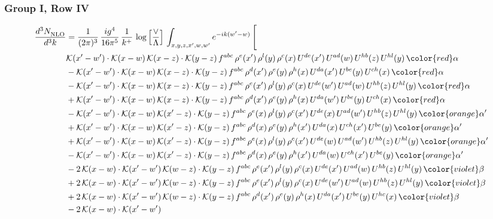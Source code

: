\subsubsection{Group I, Row IV}
\begin{align}
    \frac{d^{3}N_{\rm NLO}^{\rm}}{d^{3}k}  & = \frac{1}{(2\pi)^{3}}\, \frac{ig^{4}}{16\pi^{5}}\, \frac{1}{k^{+}}\, \log{\left[\frac{\vee}{\Lambda}\right]}\, \int_{x,y,z,x^{\prime},w,w^{\prime}}e^{-ik(w^{\prime}-w)}\, \Bigg[\notag \\ & \mathcal{K}(x'-w')\cdot \mathcal{K}(x-w)\,\mathcal{K}(x-z)\cdot \mathcal{K}(y-z)\,f^{abc}\, \rho^{e}(x')\, \rho^{l}(y)\,\rho^{c}(x)\, U^{de}(x')\,U^{ad}(w)\,U^{hb}(z)\,U^{hl}(y)\,{\color{red}\alpha}\notag \\ & -\mathcal{K}(x'-w')\cdot \mathcal{K}(x-w)\,\mathcal{K}(x-z)\cdot \mathcal{K}(y-z)\,f^{abc}\, \rho^{d}(x')\, \rho^{e}(y)\,\rho^{h}(x)\, U^{da}(x')\,U^{be}(y)\,U^{ch}(x)\,{\color{red}\alpha}\notag \\ & -\mathcal{K}(x'-w')\cdot \mathcal{K}(x-w)\,\mathcal{K}(x-z)\cdot \mathcal{K}(y-z)\,f^{abc}\, \rho^{e}(x')\, \rho^{l}(y)\,\rho^{c}(x)\, U^{de}(w')\,U^{ad}(w)\,U^{hb}(z)\,U^{hl}(y)\,{\color{red}\alpha}\notag \\ & +\mathcal{K}(x'-w')\cdot \mathcal{K}(x-w)\,\mathcal{K}(x-z)\cdot \mathcal{K}(y-z)\,f^{abc}\, \rho^{d}(x')\, \rho^{e}(y)\,\rho^{h}(x)\, U^{da}(w')\,U^{be}(y)\,U^{ch}(x)\,{\color{red}\alpha}\notag \\ & -\mathcal{K}(x'-w')\cdot \mathcal{K}(x-w)\, \mathcal{K}(x'-z)\cdot \mathcal{K}(y-z)\, f^{abc}\, \rho^{e}(x)\, \rho^{l}(y)\,\rho^{c}(x')\,U^{de}(x)\,U^{ad}(w')\,U^{hb}(z)\,U^{hl}(y)\,{\color{orange} \alpha'}\notag \\ & +\mathcal{K}(x'-w')\cdot \mathcal{K}(x-w)\, \mathcal{K}(x'-z)\cdot \mathcal{K}(y-z)\, f^{abc}\, \rho^{d}(x)\, \rho^{e}(y)\,\rho^{h}(x')\,U^{da}(x)\,U^{ch}(x')\,U^{be}(y)\,{\color{orange} \alpha'}\notag \\ & +\mathcal{K}(x'-w')\cdot \mathcal{K}(x-w)\, \mathcal{K}(x'-z)\cdot \mathcal{K}(y-z)\, f^{abc}\, \rho^{e}(x)\, \rho^{l}(y)\,\rho^{c}(x')\,U^{de}(w)\,U^{ad}(w')\,U^{hb}(z)\,U^{hl}(y)\,{\color{orange} \alpha'}\notag \\ & -\mathcal{K}(x'-w')\cdot \mathcal{K}(x-w)\, \mathcal{K}(x'-z)\cdot \mathcal{K}(y-z)\, f^{abc}\, \rho^{d}(x)\, \rho^{e}(y)\,\rho^{h}(x')\,U^{da}(w)\,U^{ch}(x')\,U^{be}(y)\,{\color{orange} \alpha'}\notag \\ & -2\,\mathcal{K}(x-w)\cdot \mathcal{K}(x'-w')\, \mathcal{K}(w-z)\cdot \mathcal{K}(y-z)\, f^{abc}\,\rho^{e}(x')\,\rho^{l}(y)\,\rho^{c}(x)\, U^{de}(x')\,U^{ad}(w)\,U^{hb}(z)\,U^{hl}(y)\,{\color{violet}\beta}\notag \\ & +2\,\mathcal{K}(x-w)\cdot \mathcal{K}(x'-w')\, \mathcal{K}(w-z)\cdot \mathcal{K}(y-z)\, f^{abc}\,\rho^{e}(x')\,\rho^{l}(y)\,\rho^{c}(x)\, U^{de}(w')\,U^{ad}(w)\,U^{hb}(z)\,U^{hl}(y)\,{\color{violet}\beta}\notag \\ & +2\,\mathcal{K}(x-w)\cdot \mathcal{K}(x'-w')\, \mathcal{K}(w-z)\cdot \mathcal{K}(y-z)\, f^{abc}\,\rho^{d}(x')\,\rho^{e}(y)\,\rho^{h}(x)\, U^{da}(x')\,U^{be}(y)\,U^{hc}(x)\,{\color{violet}\beta}\notag \\ & -2\,\mathcal{K}(x-w)\cdot \mathcal{K}(x'-w')\, 
\end{align}
